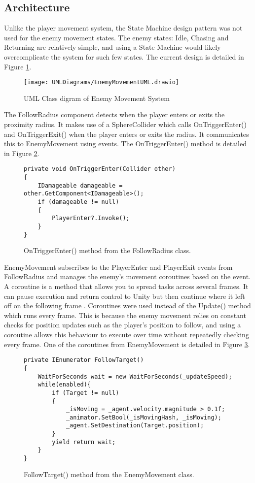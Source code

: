 \documentclass[10pt]{final_report}
\begin{document}
\subsection{Architecture}
Unlike the player movement system, the State Machine design pattern was not used for the enemy movement states. The enemy states: Idle, Chasing and Returning are relatively simple, and using a State Machine would likely overcomplicate the system for such few states. The current design is detailed in Figure \ref{fig:label_enemyMovement}.
\begin{figure}[H]
    \centering
    \texttt{[image: UMLDiagrams/EnemyMovementUML.drawio]}
    \caption{UML Class digram of Enemy Movement System}
    \label{fig:label_enemyMovement}
\end{figure}
The FollowRadius component detects when the player enters or exits the proximity radius. It makes use of a SphereCollider which calls OnTriggerEnter() and OnTriggerExit() when the player enters or exits the radius. It communicates this to EnemyMovement using events. The OnTriggerEnter() method is detailed in Figure \ref{ontriggerenter}.

\begin{figure}[H]
\begin{verbatim}
private void OnTriggerEnter(Collider other) 
{
    IDamageable damageable = other.GetComponent<IDamageable>();
    if (damageable != null)
    {
        PlayerEnter?.Invoke();
    }
}
\end{verbatim}
\caption{OnTriggerEnter() method from the FollowRadius class.}
\label{ontriggerenter}
\end{figure}

EnemyMovement subscribes to the PlayerEnter and PlayerExit events from FollowRadius and manages the enemy's movement coroutines based on the event. A coroutine is a method that allows you to spread tasks across several frames. It can pause execution and return control to Unity but then continue where it left off on the following frame \cite{unity2024_Coroutines}. Coroutines were used instead of the Update() method which runs every frame. This is because the enemy movement relies on constant checks for position updates such as the player's position to follow, and using a coroutine allows this behaviour to execute over time without repeatedly checking every frame. One of the coroutines from EnemyMovement is detailed in Figure \ref{followtarget}.
\begin{figure}[H]
\begin{verbatim}
private IEnumerator FollowTarget()
{
    WaitForSeconds wait = new WaitForSeconds(_updateSpeed);
    while(enabled){
        if (Target != null)
        {
            _isMoving = _agent.velocity.magnitude > 0.1f;
            _animator.SetBool(_isMovingHash, _isMoving);
            _agent.SetDestination(Target.position); 
        }
        yield return wait;
    }
}
\end{verbatim}
\caption{FollowTarget() method from the EnemyMovement class.}
\label{followtarget}
\end{figure}
\end{document}

